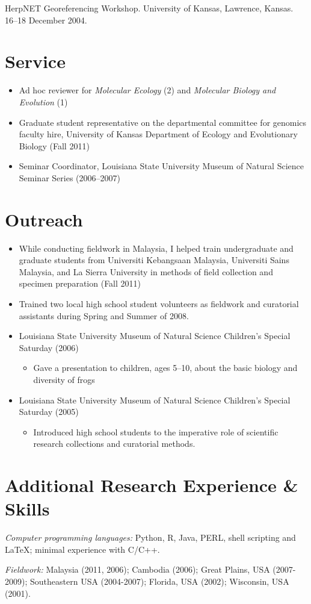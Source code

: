 \documentclass[10pt]{article}
\newenvironment{myItemize}{
  \begin{itemize}
    \setlength{\leftskip}{-4mm}
    \setlength{\itemsep}{0.25em}
    \setlength{\parskip}{0pt}
    \setlength{\parsep}{0.5em}}
  {\end{itemize}}
\newcommand{\myHangIndent}{\hangindent=5mm}
\begin{document}
\myHangIndent
HerpNET Georeferencing Workshop.
University of Kansas, Lawrence, Kansas.
16--18 December 2004.

\section*{Service}
\begin{myItemize}
\item Ad hoc reviewer for \emph{Molecular Ecology} (2) and \emph{Molecular Biology and Evolution} (1)
\item Graduate student representative on the departmental committee for genomics faculty hire, University of Kansas Department of Ecology and Evolutionary Biology (Fall 2011)
\item Seminar Coordinator, Louisiana State University Museum of Natural Science Seminar Series (2006--2007)
\end{myItemize}

\section*{Outreach}
\begin{myItemize}
\item While conducting fieldwork in Malaysia, I helped train undergraduate and graduate students from Universiti Kebangsaan Malaysia, Universiti Sains Malaysia, and La Sierra University in methods of field collection and specimen preparation (Fall 2011)
\item Trained two local high school student volunteers as fieldwork and curatorial assistants during Spring and Summer of 2008.
\item Louisiana State University Museum of Natural Science Children’s Special Saturday (2006)
	\begin{myItemize}
	\item Gave a presentation to children, ages 5--10, about the basic biology and diversity of frogs
	\end{myItemize}
\item Louisiana State University Museum of Natural Science Children’s Special Saturday (2005)
	\begin{myItemize}
	\item Introduced high school students to the imperative role of scientific research collections and curatorial methods.
	\end{myItemize}
\end{myItemize}

\section*{Additional Research Experience \& Skills}
\myHangIndent
{\sffamily\itshape Computer programming languages:} Python, R, Java, PERL, shell scripting and \LaTeX; minimal experience with C/C++.

\myHangIndent
{\sffamily\itshape Fieldwork:} Malaysia (2011, 2006); Cambodia (2006); Great Plains, USA (2007-2009); Southeastern USA (2004-2007); Florida, USA (2002); Wisconsin, USA (2001).
\end{document}

